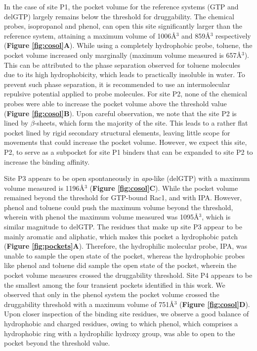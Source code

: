 \documentclass[12pt,a4paper]{achemso}
\begin{document}
In the case of site P1, the pocket volume for the reference systems (GTP and delGTP) largely remains below the threshold for druggability. The chemical probes, isopropanol and phenol, can open this site significantly larger than the reference system, attaining a maximum volume of 1006\r{A}$^3$ and  859\r{A}$^3$ respectively (\textbf{Figure \ref{fig:cosol}A}). While using a completely hydrophobic probe, toluene, the pocket volume increased only marginally (maximum volume measured is 657\r{A}$^3$). This can be attributed to the phase separation observed for toluene molecules due to its high hydrophobicity, which leads to practically insoluble in water. To prevent such phase separation, it is recommended to use an intermolecular repulsive potential applied to probe molecules\cite{cosolvkit}. For site P2, none of the chemical probes were able to increase the pocket volume above the threshold value (\textbf{Figure \ref{fig:cosol}B}). Upon careful observation, we note that the site P2 is lined by $\beta$-sheets, which form the majority of the site. This leads to a rather flat pocket lined by rigid secondary structural elements, leaving little scope for movements that could increase the pocket volume. However, we expect this site, P2, to serve as a subpocket for site P1 binders that can be expanded to site P2 to increase the binding affinity. 

Site P3 appears to be open spontaneously in \textit{apo}-like (delGTP) with a maximum volume measured is 1196\r{A}$^3$ (\textbf{Figure \ref{fig:cosol}C}). While the pocket volume remained beyond the threshold for GTP-bound Rac1, and with IPA. However, phenol and toluene could push the maximum volume beyond the threshold, wherein with phenol the maximum volume measured was 1095\r{A}$^3$, which is similar magnitude to delGTP. The residues that make up site P3 appear to be mainly aromatic and aliphatic, which makes this pocket a hydrophobic patch (\textbf{Figure \ref{fig:pockets}A}). Therefore, the hydrophilic molecular probe, IPA, was unable to sample the open state of the pocket, whereas the hydrophobic probes like phenol and toluene did sample the open state of the pocket, wherein the pocket volume measures crossed the druggability threshold. Site P4 appears to be the smallest among the four transient pockets identified in this work. We observed that only in the phenol system the pocket volume crossed the druggability threshold with a maximum volume of 751\r{A}$^3$ (\textbf{Figure \ref{fig:cosol}D}). Upon closer inspection of the binding site residues, we observe a good balance of hydrophobic and charged residues, owing to which phenol, which comprises a hydrophobic ring with a hydrophilic hydroxy group, was able to open to the pocket beyond the threshold value. 
\end{document}
